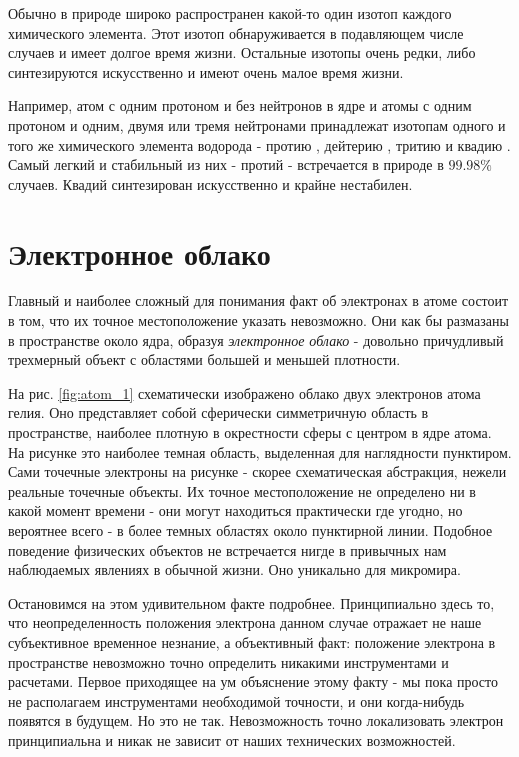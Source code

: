 Обычно в природе широко распространен какой-то один изотоп каждого химического элемента.
Этот изотоп обнаруживается в подавляющем числе случаев и имеет долгое время жизни.
Остальные изотопы очень редки, либо синтезируются искусственно и имеют очень малое время жизни. 

Например, атом с одним протоном и без нейтронов в ядре и атомы с одним протоном и одним, двумя или тремя нейтронами принадлежат изотопам одного и того же химического элемента водорода - протию , дейтерию , тритию  и квадию .
Самый легкий и стабильный из них - протий - встречается в природе в $99.98\%$ случаев.
Квадий синтезирован искусственно и крайне нестабилен.


\section*{Электронное облако}

Главный и наиболее сложный для понимания факт об электронах в атоме состоит в том, что их точное местоположение указать невозможно.
Они как бы размазаны в пространстве около ядра, образуя \textit{электронное облако} - довольно причудливый трехмерный объект с областями большей и меньшей плотности.

На рис. \ref{fig:atom_1} схематически изображено облако двух электронов атома гелия.
Оно представляет собой сферически симметричную область в пространстве, наиболее плотную в окрестности сферы с центром в ядре атома.
На рисунке это наиболее темная область, выделенная для наглядности пунктиром.
Сами точечные электроны на рисунке - скорее схематическая абстракция, нежели реальные точечные объекты.
Их точное местоположение не определено ни в какой момент времени - они могут находиться практически где угодно, но вероятнее всего - в более темных областях около пунктирной линии.
Подобное поведение физических объектов не встречается нигде в привычных нам наблюдаемых явлениях в обычной жизни.
Оно уникально для микромира. 

Остановимся на этом удивительном факте подробнее.
Принципиально здесь то, что неопределенность положения электрона данном случае отражает не наше субъективное временное незнание, а объективный факт: положение электрона в пространстве невозможно точно определить никакими инструментами и расчетами.
Первое приходящее на ум объяснение этому факту - мы пока просто не располагаем инструментами необходимой точности, и они когда-нибудь появятся в будущем.
Но это не так.
Невозможность точно локализовать электрон принципиальна и никак не зависит от наших технических возможностей.

